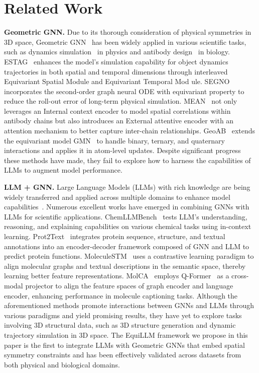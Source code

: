 \section{Related Work}
\textbf{Geometric GNN.} Due to its thorough consideration of physical symmetries in 3D space, Geometric GNN~\citep{satorras2021n, fuchs2020se} has been widely applied in various scientific tasks, such as dynamics simulation~\citep{xu2024equivariant} in physics and antibody design~\citep{lin2024geoab} in biology. ESTAG~\citep{wu2024equivariant} enhances the model's simulation capability for object dynamics trajectories in both spatial and temporal dimensions through interleaved Equivariant Spatial Module and Equivariant Temporal Mod   ule. SEGNO~\citep{liu2024segno} incorporates the second-order graph neural ODE with equivariant property to reduce the roll-out error of long-term physical simulation. MEAN~\citep{kong2022conditional} not only leverages an Internal context encoder to model spatial correlations within antibody chains but also introduces an External attentive encoder with an attention mechanism to better capture inter-chain relationships. GeoAB~\citep{lin2024geoab} extends the equivariant model GMN~\citep{huang2022equivariant} to handle binary, ternary, and quaternary interactions and applies it in atom-level updates. Despite significant progress these methods have made, they fail to explore how to harness the capabilities of LLMs to augment model performance.

\textbf{LLM + GNN.} Large Language Models (LLMs) with rich knowledge are being widely transferred and applied across multiple domains to enhance model capabilities~\citep{singhal2023large, singhal2025toward}. Numerous excellent works have emerged in combining GNNs with LLMs for scientific applications. ChemLLMBench~\citep{guo2023can} tests LLM's understanding, reasoning, and explaining capabilities on various chemical tasks using in-context learning. Prot2Text~\citep{abdine2024prot2text} integrates protein sequence, structure, and textual annotations into an encoder-decoder framework composed of GNN and LLM to predict protein functions. MoleculeSTM~\citep{liu2023multi} uses a contrastive learning paradigm to align molecular graphs and textual descriptions in the semantic space, thereby learning better feature representations. MolCA~\citep{liu2023molca} employs Q-Former~\citep{li2023blip} as a cross-modal projector to align the feature spaces of graph encoder and language encoder, enhancing performance in molecule captioning tasks. Although the aforementioned methods promote interactions between GNNs and LLMs through various paradigms and yield promising results, they have yet to explore tasks involving 3D structural data, such as 3D structure generation and dynamic trajectory simulation in 3D space. The EquiLLM framework we propose in this paper is the first to integrate LLMs with Geometric GNNs that embed spatial symmetry constraints and has been effectively validated across datasets from both physical and biological domains.
